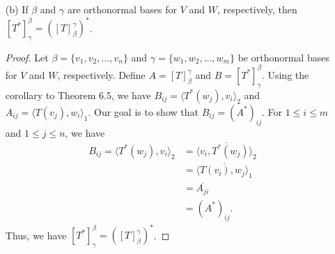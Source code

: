 \begin{enumerate}
\begin{proof}
        \end{proof}
    \item[(b)] If \( \beta \) and \( \gamma \) are orthonormal bases for \( V    \) and \( W  \), respectively, then \( [T^{*}]_{\gamma}^{\beta}  = ([T]_{\beta}^{\gamma})^{*} \).
        \begin{proof}
        Let \( \beta = \{ {v}_{1}, {v}_{2}, \dots, {v}_{n} \}  \) and \( \gamma = \{ {w}_{1}, {w}_{2}, \dots, {w}_{m} \}  \) be orthonormal bases for \( V  \) and \( W  \), respectively. Define \( A = [T]_{\beta}^{\gamma} \) and \( B = [T^{*}]_{\gamma}^{\beta} \). Using the corollary to Theorem 6.5, we have \( {B}_{ij} = \langle T^{*}({w}_{j}) , {v}_{i} \rangle_2 \) and \( {A}_{ij} = \langle T({v}_{j}) , {w}_{i} \rangle_1 \). Our goal is to show that \( {B}_{ij} = {(A^{*})}_{ij} \). For \( 1 \leq i \leq m  \) and \( 1 \leq j \leq n  \), we have 
        \begin{align*}
            {B}_{ij} = \langle T^{*}({w}_{j}) , {v}_{i} \rangle_2 &= \overline{\langle {v}_{i}  ,  T^{*}({w}_{j}) \rangle_2} \\
                                                                  &= \overline{\langle T({v}_{i}) , {w}_{j} \rangle_1 } \\
                                                                  &= \overline{{A}_{ji}} \\
                                                                  &= {(A^{*})}_{ij}.
        \end{align*}
        Thus, we have \( [T^{*}]_{\gamma}^{\beta}  = ([T]_{\beta}^{\gamma})^{*} \).


\end{proof}
\end{enumerate}
